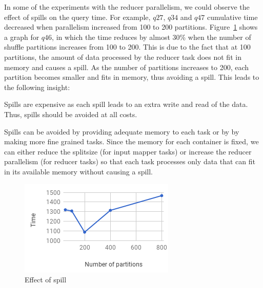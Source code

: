 In some of the experiments with the reducer parallelism, we could observe the effect of spills on the query time. For example, $q27$, $q34$ and $q47$ cumulative time decreased when parallelism increased from 100 to 200 partitions. Figure~\ref{fig:q46} shows a graph for $q46$, in which the time reduces by almost 30\% when the number of shuffle partitions increases from 100 to 200. This is due to the fact that at 100 partitions, the amount of data processed by the reducer task does not fit in memory and causes a spill. As the number of partitions increases to 200, each partition becomes smaller and fits in memory, thus avoiding a spill. This leads to the following insight:
\begin{insight}
	\label{insight:spill}
	Spills are expensive as each spill leads to an extra write and read of the data. Thus, spills should be avoided at all costs.
\end{insight}
Spills can be avoided by providing adequate memory to each task or by by making more fine grained tasks. Since the memory for each container is fixed, we can either reduce the splitsize (for input mapper tasks) or increase the reducer parallelism (for reducer tasks) so that each task processes only data that can fit in its available memory without causing a spill.

\begin{figure}[h]
	\includegraphics[width=\linewidth]{fig/q46.png}
	\caption{Effect of spill}
	\label{fig:q46}
\end{figure}


